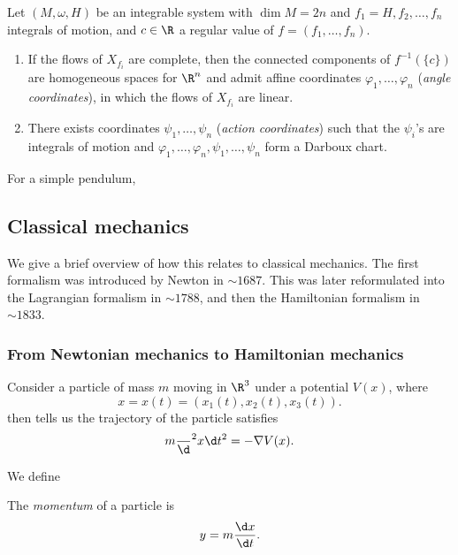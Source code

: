 \documentclass[a4paper]{article}
\begin{document}
\begin{thm}
  Let $(M, \omega, H)$ be an integrable system with $\dim M = 2n$ and $f_1 = H, f_2, \ldots, f_n$ integrals of motion, and $c \in \R$ a regular value of $f = (f_1, \ldots, f_n)$.

  \begin{enumerate}
    \item If the flows of $X_{f_i}$ are complete, then the connected components of $f^{-1}(\{c\})$ are homogeneous spaces for $\R^n$ and admit affine coordinates $\varphi_1, \ldots, \varphi_n$ (\emph{angle coordinates}), in which the flows of $X_{f_i}$ are linear.
    \item There exists coordinates $\psi_1, \ldots, \psi_n$ (\emph{action coordinates}) such that the $\psi_i$'s are integrals of motion and $\varphi_1, \ldots, \varphi_n, \psi_1, \ldots, \psi_n$ form a Darboux chart.
  \end{enumerate}
\end{thm}

\begin{eg}
  For a simple pendulum, %
\end{eg}

\subsection{Classical mechanics}
We give a brief overview of how this relates to classical mechanics. The first formalism was introduced by Newton in $\sim 1687$. This was later reformulated into the Lagrangian formalism in $\sim 1788$, and then the Hamiltonian formalism in $\sim 1833$.

\subsubsection*{From Newtonian mechanics to Hamiltonian mechanics}
\begin{eg}
  Consider a particle of mass $m$ moving in $\R^3$ under a potential $V(x)$, where
  \[
    x = x(t) = (x_1(t), x_2(t), x_3(t)).
  \]
   then tells us the trajectory of the particle satisfies
  \[
    m\frac{}\d^2 x{\d t^2} = - \nabla V(x).
  \]
\end{eg}
We define
\begin{defi}[Momentum]
  The \emph{momentum} of a particle is
  \[
    y = m \frac{\d x}{\d t}.
  \]
\end{defi}
\end{document}

